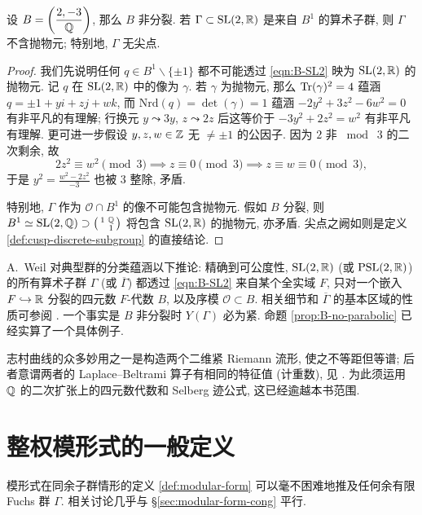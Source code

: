 \begin{proposition}\label{prop:B-no-parabolic}
	设 $B = \left( \dfrac{2, -3}{\mathbb{Q}} \right)$, 那么 $B$ 非分裂. 若 $\Gamma \subset \operatorname{SL}(2,\mathbb{R})$ 是来自 $B^1$ 的算术子群, 则 $\Gamma$ 不含抛物元; 特别地, $\Gamma$ 无尖点.
\end{proposition}
\begin{proof}
	我们先说明任何 $q \in B^1 \smallsetminus \{\pm 1\}$ 都不可能透过 \eqref{eqn:B-SL2} 映为 $\operatorname{SL}(2,\mathbb{R})$ 的抛物元. 记 $q$ 在 $\operatorname{SL}(2,\mathbb{R})$ 中的像为 $\gamma$. 若 $\gamma$ 为抛物元, 那么 $\operatorname{Tr}(\gamma)^2 = 4$ 蕴涵 $q = \pm 1 + yi + zj + wk$, 而 $\text{Nrd}(q) = \det(\gamma)=1$ 蕴涵 $-2y^2 + 3z^2 - 6w^2 = 0$ 有非平凡的有理解; 行换元 $y \leadsto 3y$, $z  \leadsto 2z$ 后这等价于 $-3y^2 + 2z^2 = w^2$ 有非平凡有理解. 更可进一步假设 $y,z,w \in \mathbb{Z}$ 无 $\neq \pm 1$ 的公因子. 因为 $2$ 非 $\bmod\; 3$ 的二次剩余, 故
	\[ 2z^2 \equiv w^2 \pmod 3 \implies z \equiv 0 \pmod 3 \implies z \equiv w \equiv 0 \pmod 3, \]
	于是 $y^2 = \frac{w^2 - 2z^2}{-3}$ 也被 $3$ 整除, 矛盾.
	
	特别地, $\Gamma$ 作为 $\mathcal{O} \cap B^1$ 的像不可能包含抛物元. 假如 $B$ 分裂, 则 $B^1 \simeq \operatorname{SL}(2,\mathbb{Q}) \supset \bigl(\begin{smallmatrix} 1 & \mathbb{Q} \\  & 1 \end{smallmatrix}\bigr)$ 将包含 $\operatorname{SL}(2,\mathbb{R})$ 的抛物元, 亦矛盾. 尖点之阙如则是定义 \ref{def:cusp-discrete-subgroup} 的直接结论.
\end{proof}

\begin{remark}
	A.\ Weil 对典型群的分类蕴涵以下推论: 精确到可公度性, $\operatorname{SL}(2,\mathbb{R})$ (或 $\operatorname{PSL}(2, \mathbb{R})$) 的所有算术子群 $\Gamma$ (或 $\overline{\Gamma}$) 都透过 \eqref{eqn:B-SL2} 来自某个全实域 $F$, 只对一个嵌入 $F \hookrightarrow \mathbb{R}$ 分裂的四元数 $F$-代数 $B$, 以及序模 $\mathcal{O} \subset B$. 相关细节和 $\overline{\Gamma}$ 的基本区域的性质可参阅 \cite[\S 38]{Voi}. 一个事实是 $B$ 非分裂时 $Y(\Gamma)$ 必为紧. 命题 \ref{prop:B-no-parabolic} 已经实算了一个具体例子.
\end{remark}

志村曲线的众多妙用之一是构造两个二维紧 Riemann 流形, 使之不等距但等谱; 后者意谓两者的 Laplace--Beltrami 算子有相同的特征值 (计重数), 见 \cite[IV.3.E]{Vi80}. 为此须运用 $\mathbb{Q}$ 的二次扩张上的四元数代数和 Selberg 迹公式, 这已经逾越本书范围.


\section{整权模形式的一般定义}\label{sec:modular-form-general}
模形式在同余子群情形的定义 \ref{def:modular-form} 可以毫不困难地推及任何余有限 Fuchs 群 $\Gamma$. 相关讨论几乎与 \S\ref{sec:modular-form-cong} 平行.

